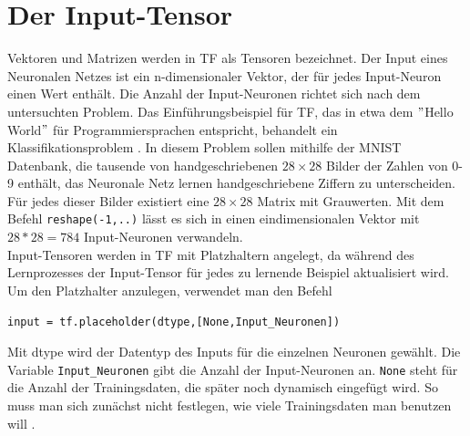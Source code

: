 \section{Der Input-Tensor}
Vektoren und Matrizen werden in \gls{TF} als Tensoren bezeichnet. Der Input eines Neuronalen Netzes ist ein n-dimensionaler Vektor, der f\"ur jedes Input-Neuron einen Wert enth\"alt. Die Anzahl der Input-Neuronen richtet sich nach dem untersuchten Problem. Das Einf\"uhrungsbeispiel f\"ur \gls{TF}, das in etwa dem $"$Hello World$"$ f\"ur Programmiersprachen entspricht, behandelt ein Klassifikationsproblem \cite{handson}. In diesem Problem sollen mithilfe der \gls{MNIST} Datenbank, die tausende von handgeschriebenen $28 \times 28$ Bilder der Zahlen von 0-9 enth\"alt, das Neuronale Netz lernen handgeschriebene Ziffern zu unterscheiden. F\"ur jedes dieser Bilder existiert eine $28 \times 28$ Matrix mit Grauwerten. Mit dem Befehl \lstinline$reshape(-1,..)$ \cite{handson} l\"asst es sich in einen eindimensionalen Vektor mit  $28*28=784$ Input-Neuronen verwandeln.\\
Input-Tensoren werden in \gls{TF} mit Platzhaltern angelegt, da w\"ahrend des Lernprozesses der Input-Tensor f\"ur jedes zu lernende Beispiel aktualisiert wird. Um den Platzhalter anzulegen, verwendet man den Befehl \cite{cookbook}
\vspace{0.3cm}
\begin{lstlisting}
input = tf.placeholder(dtype,[None,Input_Neuronen])
\end{lstlisting}
Mit dtype wird der Datentyp des Inputs f\"ur die einzelnen Neuronen gew\"ahlt. Die Variable \lstinline$Input_Neuronen$ gibt die Anzahl der Input-Neuronen an. \lstinline$None$ steht f\"ur die Anzahl der Trainingsdaten, die sp\"ater noch dynamisch eingef\"ugt wird. So muss man sich zun\"achst nicht festlegen, wie viele Trainingsdaten man benutzen will \cite{handson}. 



